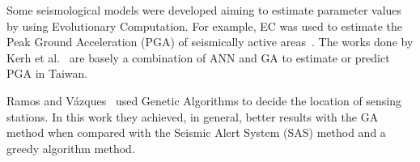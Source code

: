 Some seismological models were developed aiming to estimate parameter values by using Evolutionary Computation. For example, EC was used to estimate the Peak Ground Acceleration (PGA) of seismically active areas~\cite{Kermani2009,Cabalar2009,Kerh2010,Kerh2015}. 
The works done by Kerh et al.~\cite{Kerh2010, Kerh2015} are basely a combination of ANN and GA to estimate or predict PGA in Taiwan. %

 
Ramos and Vázques~\cite{Ramos2011} used Genetic Algorithms to decide the location of sensing stations. In this work they achieved, in general, better results with the GA method when compared with the Seismic Alert System (SAS) method and a greedy algorithm method. %


